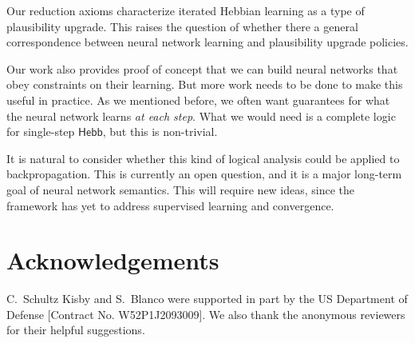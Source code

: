 \documentclass[letterpaper]{article}
\theoremstyle{definition}
\newcommand{\HebbNoArgs}{\mathsf{Hebb}}
\begin{document}
Our reduction axioms characterize iterated Hebbian learning as a type of plausibility upgrade.  This raises the question of whether there a general correspondence between neural network learning and plausibility upgrade policies.

Our work also provides proof of concept that we can build neural networks that obey constraints on their learning.  But more work needs to be done to make this useful in practice.  As we mentioned before, we often want guarantees for what the neural network learns \emph{at each step}.  What we would need is a complete logic for single-step $\HebbNoArgs$, but this is non-trivial.

It is natural to consider whether this kind of logical analysis could be applied to backpropagation.  This is currently an open question, and it is a major long-term goal of neural network semantics.  This will require new ideas, since the framework has yet to address  supervised learning and convergence.

\section*{Acknowledgements}
C.~Schultz Kisby and S.~Blanco were supported in part by the US Department of Defense [Contract No. W52P1J2093009].  We also thank the anonymous reviewers for their helpful suggestions.


\end{document}
